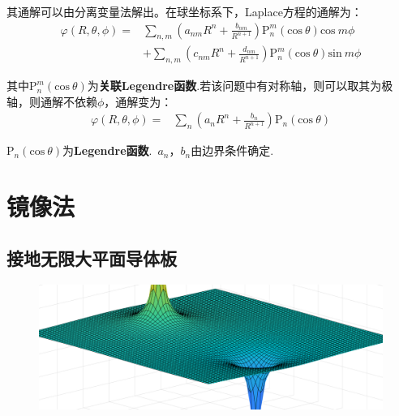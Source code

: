 \documentclass[main.tex]{subfiles}
\begin{document}
其通解可以由分离变量法解出。在球坐标系下，Laplace方程的通解为：
\begin{align}
    \label{Laplacejie}\varphi(R,\theta ,\phi) =&\sum_{n,m}^{} (a_{nm}R^n+\frac{b_{nm}}{R^{n+1}})\mathrm{P}_n^m(\mathrm{cos}\ \theta  )\mathrm{cos}\  m\phi\\
    &+\sum_{n,m}^{} (c_{nm}R^n+\frac{d_{nm}}{R^{n+1}})\mathrm{P}_n^m(\mathrm{cos}\ \theta  )\mathrm{sin}\  m\phi
\end{align}

其中$\mathrm{P}_n^m(\mathrm{cos}\ \theta  )$为\textbf{关联Legendre函数}.若该问题中有对称轴，则可以取其为极轴，则通解不依赖$\phi $，通解变为：
\begin{align}
    \varphi(R,\theta ,\phi) =&\sum_{n}^{} (a_{n}R^n+\frac{b_{n}}{R^{n+1}})\mathrm{P}_n(\mathrm{cos}\ \theta  )
\end{align}

$\mathrm{P}_n(\mathrm{cos}\ \theta  )$为\textbf{Legendre函数}.\ $a_n$，$b_n$由边界条件确定.

\section{镜像法}
\subsection{接地无限大平面导体板}
\begin{figure}[h]
    \centering
    \includegraphics[width=1\linewidth]{jingxiangfa1.png}
\end{figure}
\end{document}
